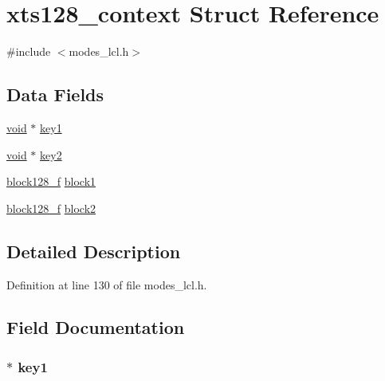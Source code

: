 \hypertarget{structxts128__context}{}\section{xts128\+\_\+context Struct Reference}
\label{structxts128__context}


{\ttfamily \#include $<$modes\+\_\+lcl.\+h$>$}

\subsection*{Data Fields}
\begin{DoxyCompactItemize}
\item 
\hyperlink{hw__4758__cca_8h_afad4d591c7931ff6dc5bf69c76c96aa0}{void} $\ast$ \hyperlink{structxts128__context_a9dabeac4ab73b1993b21924321bafcb9}{key1}
\item 
\hyperlink{hw__4758__cca_8h_afad4d591c7931ff6dc5bf69c76c96aa0}{void} $\ast$ \hyperlink{structxts128__context_a27d8c524b81a53179ad1740e3873cd57}{key2}
\item 
\hyperlink{include_2openssl_2modes_8h_a3be4f2f2fbba3b92b026d8072dd6c3ad}{block128\+\_\+f} \hyperlink{structxts128__context_ac1bc2eb39f76346ab82ed2763ebd42cf}{block1}
\item 
\hyperlink{include_2openssl_2modes_8h_a3be4f2f2fbba3b92b026d8072dd6c3ad}{block128\+\_\+f} \hyperlink{structxts128__context_a2099e113f7606ae71c6a69900303a7e1}{block2}
\end{DoxyCompactItemize}


\subsection{Detailed Description}


Definition at line 130 of file modes\+\_\+lcl.\+h.



\subsection{Field Documentation}
\subsubsection[{\texorpdfstring{key1}{key1}}]{$\ast$ key1}\hypertarget{structxts128__context_a9dabeac4ab73b1993b21924321bafcb9}{}\label{structxts128__context_a9dabeac4ab73b1993b21924321bafcb9}


